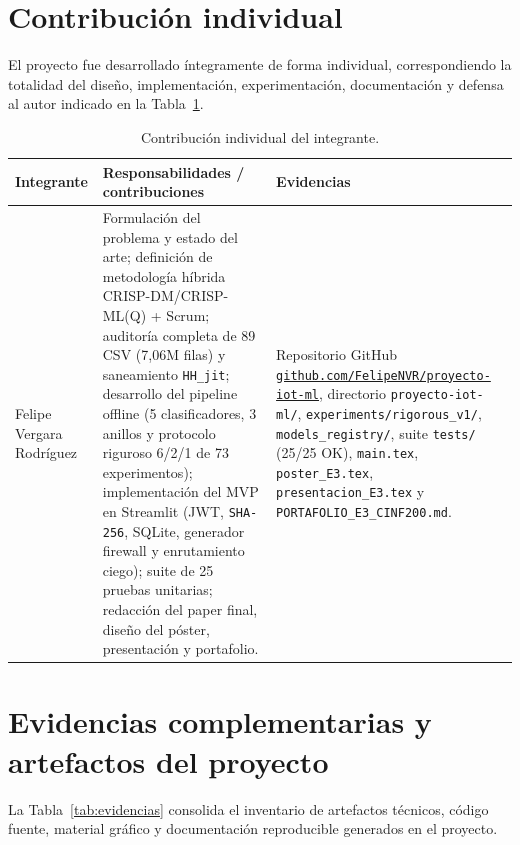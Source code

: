 \documentclass[11pt,a4paper]{article}
\newcommand{\students}{Felipe Vergara Rodríguez}
\begin{document}
\section{Contribución individual}
El proyecto fue desarrollado íntegramente de forma individual, correspondiendo la totalidad del diseño, implementación, experimentación, documentación y defensa al autor indicado en la Tabla~\ref{tab:contribucion}.

\begin{table}[H]
\centering
\caption{Contribución individual del integrante.}
\label{tab:contribucion}
\footnotesize
\begin{tabularx}{\textwidth}{p{}p{}X}
\toprule
\textbf{Integrante} & \textbf{Responsabilidades / contribuciones} & \textbf{Evidencias} \\
\midrule
\students & Formulación del problema y estado del arte; definición de metodología híbrida CRISP-DM/CRISP-ML(Q) + Scrum; auditoría completa de 89 CSV (7,06M filas) y saneamiento \texttt{HH\_jit}; desarrollo del pipeline offline (5 clasificadores, 3 anillos y protocolo riguroso 6/2/1 de 73 experimentos); implementación del MVP en Streamlit (JWT, \texttt{SHA-256}, SQLite, generador firewall y enrutamiento ciego); suite de 25 pruebas unitarias; redacción del paper final, diseño del póster, presentación y portafolio. & Repositorio GitHub \href{https://github.com/FelipeNVR/proyecto-iot-ml}{\texttt{github.com/FelipeNVR/\allowbreak proyecto-iot-ml}}, directorio \texttt{proyecto-iot-ml/}, \texttt{experiments/rigorous\_v1/}, \texttt{models\_registry/}, suite \texttt{tests/} (25/25 OK), \texttt{main.tex}, \texttt{poster\_E3.tex}, \texttt{presentacion\_E3.tex} y \texttt{PORTAFOLIO\_E3\_CINF200.md}. \\
\bottomrule
\end{tabularx}
\end{table}

\section{Evidencias complementarias y artefactos del proyecto}
La Tabla~\ref{tab:evidencias} consolida el inventario de artefactos técnicos, código fuente, material gráfico y documentación reproducible generados en el proyecto.
\end{document}
